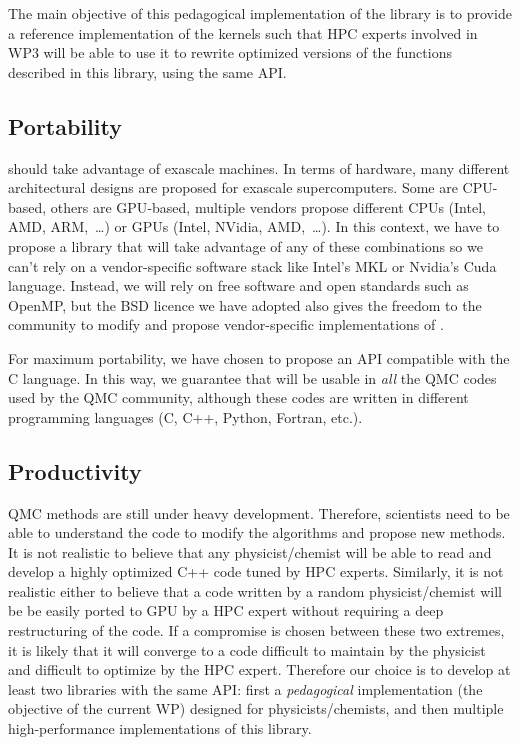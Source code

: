 The main objective of this pedagogical implementation of the library
is to provide a reference implementation of the kernels such that
\ac{HPC} experts involved in \ac{WP}3 will be able to use it to rewrite
optimized versions of the functions described in this library, using the same
\ac{API}.

\subsection{Portability}

\QMCkl{} should take advantage of exascale machines. In terms of hardware,
many different architectural designs are proposed for exascale
supercomputers. Some are CPU-based, others are \ac{GPU}-based, multiple vendors
propose different CPUs (Intel, AMD, ARM,~\dots) or \acp{GPU} (Intel,
NVidia, AMD,~\dots). In this context, we have to propose a library that
will take advantage of any of these combinations so we can't rely on 
a vendor-specific software stack like Intel's \ac{MKL} or Nvidia's
Cuda language. Instead, we
will rely on free software and open standards such as OpenMP, but the BSD
licence we have adopted also gives the freedom to the community to
modify \QMCkl{} and propose vendor-specific implementations of \QMCkl{}.

For maximum portability, we have chosen to propose an \ac{API} compatible with
the C language. In this way, we guarantee that \QMCkl{} will be usable in
\emph{all} the QMC codes used by the \ac{QMC} community, although these codes
are written in different programming languages (C, C++, Python, Fortran, etc.).

\subsection{Productivity}

\ac{QMC} methods are still under heavy development. Therefore,
scientists need to be able to understand the code to modify the
algorithms and propose new methods. It is not realistic to believe
that any physicist/chemist will be able to read and develop a highly optimized
C++ code tuned by \ac{HPC} experts. Similarly, it is not realistic
either to believe that a code written by a random physicist/chemist will
be be easily ported to \ac{GPU} by a \ac{HPC} expert without requiring a deep 
restructuring of the code. If a compromise
is chosen between these two extremes, it is likely that it will
converge to a code difficult to maintain by the physicist and
difficult to optimize by the \ac{HPC} expert. Therefore our choice is to
develop at least two libraries with the same \ac{API}: first a
\emph{pedagogical} implementation (the objective of the current \ac{WP})
designed for physicists/chemists, and then multiple high-performance
implementations of this library.


